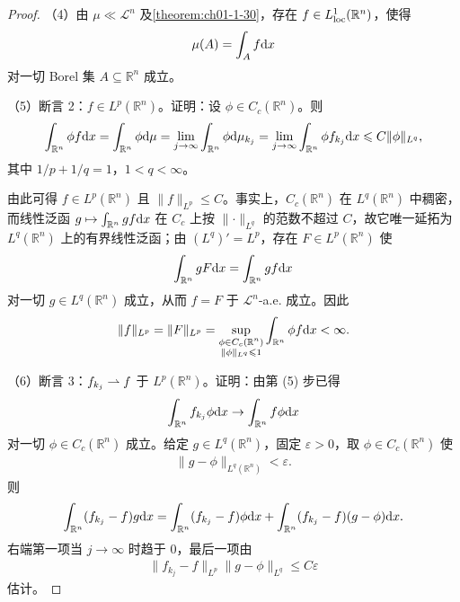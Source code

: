 \documentclass[../../main.tex]{subfiles}%
\begin{document}
\begin{proof}
（4）由 $\mu\ll\mathcal{L}^n$ 及\cref{theorem:ch01-1-30}，存在 $f\in L^1_{\mathrm{loc}}(\mathbb{R}^n)$，使得%
\begin{align*}
\mu(A)=\int_Af\mathrm{d} x
\end{align*}
对一切 Borel 集 $A\subseteq\mathbb{R}^n$ 成立。

（5）断言 2：$f\in L^p(\mathbb{R}^n)$。证明：设 $\phi\in C_c(\mathbb{R}^n)$。则
\begin{align*}
\int_{\mathbb{R}^n}\phi f\mathrm{d} x=\int_{\mathbb{R}^n}\phi\mathrm{d}\mu=\lim_{j\to\infty}\int_{\mathbb{R}^n}\phi\mathrm{d}\mu_{k_j}
=\lim_{j\to\infty}\int_{\mathbb{R}^n}\phi f_{k_j}\mathrm{d} x\leqslant C\lVert\phi\rVert_{L^q},
\end{align*}
其中 $1/p+1/q=1$，$1<q<\infty$。

由此可得 $f\in L^p(\mathbb{R}^n)$ 且 $\lVert f\rVert_{L^p}\leqslant C$。事实上，$C_c(\mathbb{R}^n)$ 在 $L^q(\mathbb{R}^n)$ 中稠密，而线性泛函 $g\mapsto\int_{\mathbb{R}^n}gf\mathrm{d} x$ 在 $C_c$ 上按 $\lVert\cdot\rVert_{L^q}$ 的范数不超过 $C$，故它唯一延拓为 $L^q(\mathbb{R}^n)$ 上的有界线性泛函；由 $(L^q)'=L^p$，存在 $F\in L^p(\mathbb{R}^n)$ 使
\begin{align*}
\int_{\mathbb{R}^n}gF\mathrm{d} x=\int_{\mathbb{R}^n}gf\mathrm{d} x
\end{align*}
对一切 $g\in L^q(\mathbb{R}^n)$ 成立，从而 $f=F$ 于 $\mathcal{L}^n$-a.e. 成立。因此
\begin{align*}
\lVert f\rVert_{L^p}=\lVert F\rVert_{L^p}=\sup_{\substack{\phi\in C_c(\mathbb{R}^n)\\ \lVert\phi\rVert_{L^q}\leqslant1}}\int_{\mathbb{R}^n}\phi f\mathrm{d} x<\infty .
\end{align*}

（6）断言 3：$f_{k_j}\rightharpoonup f$ 于 $L^p(\mathbb{R}^n)$。证明：由第 (5) 步已得
\begin{align*}
\int_{\mathbb{R}^n}f_{k_j}\phi\mathrm{d} x\to\int_{\mathbb{R}^n}f\phi\mathrm{d} x
\end{align*}
对一切 $\phi\in C_c(\mathbb{R}^n)$ 成立。给定 $g\in L^q(\mathbb{R}^n)$，固定 $\varepsilon>0$，取 $\phi\in C_c(\mathbb{R}^n)$ 使
\begin{align*}
\lVert g-\phi\rVert_{L^q(\mathbb{R}^n)}<\varepsilon .
\end{align*}
则
\begin{align*}
\int_{\mathbb{R}^n}(f_{k_j}-f)g\mathrm{d} x=\int_{\mathbb{R}^n}(f_{k_j}-f)\phi\mathrm{d} x+\int_{\mathbb{R}^n}(f_{k_j}-f)(g-\phi)\mathrm{d} x .
\end{align*}
右端第一项当 $j\to\infty$ 时趋于 $0$，最后一项由
\begin{align*}
\lVert f_{k_j}-f\rVert_{L^p}\lVert g-\phi\rVert_{L^q}\leqslant C\varepsilon
\end{align*}
估计。


\end{proof}
\end{document}
